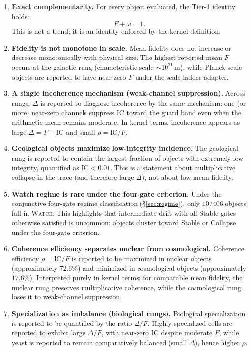 \documentclass[
  aps,
  prd,
  preprint,
  superscriptaddress,
  nofootinbib,
  floatfix
]{revtex4-2}
\newcommand{\IC}{\mathrm{IC}}
\begin{document}
\begin{enumerate}[leftmargin=2.2em]
  \item \textbf{Exact complementarity.}
  For every object evaluated, the Tier-1 identity holds:
  \begin{equation}
    F+\omega=1.
  \end{equation}
  This is not a trend; it is an identity enforced by the kernel definition.

  \item \textbf{Fidelity is not monotone in scale.}
  Mean fidelity does not increase or decrease monotonically with physical size.
  The highest reported mean $F$ occurs at the galactic rung (characteristic scale $\sim 10^{21}\,\mathrm{m}$),
  while Planck-scale objects are reported to have near-zero $F$ under the scale-ladder adapter.

  \item \textbf{A single incoherence mechanism (weak-channel suppression).}
  Across rungs, $\Delta$ is reported to diagnose incoherence by the same mechanism:
  one (or more) near-zero channels suppress $\IC$ toward the guard band even when the arithmetic mean remains moderate.
  In kernel terms, incoherence appears as large $\Delta=F-\IC$ and small $\rho=\IC/F$.

  \item \textbf{Geological objects maximize low-integrity incidence.}
  The geological rung is reported to contain the largest fraction of objects with extremely low integrity,
  quantified as $\IC<0.01$.
  This is a statement about multiplicative collapse in the trace (and therefore large $\Delta$), not about low mean fidelity.

  \item \textbf{Watch regime is rare under the four-gate criterion.}
  Under the conjunctive four-gate regime classification (\S\ref{sec:regime}), only $10/406$ objects fall in \textsc{Watch}.
  This highlights that intermediate drift with all Stable gates otherwise satisfied is uncommon;
  objects cluster toward Stable or Collapse under the four-gate criterion.

  \item \textbf{Coherence efficiency separates nuclear from cosmological.}
  Coherence efficiency $\rho=\IC/F$ is reported to be maximized in nuclear objects (approximately $72.6\%$)
  and minimized in cosmological objects (approximately $17.6\%$).
  Interpreted purely in kernel terms: for comparable mean fidelity, the nuclear rung preserves multiplicative coherence,
  while the cosmological rung loses it to weak-channel suppression.

  \item \textbf{Specialization as imbalance (biological rungs).}
  Biological specialization is reported to be quantified by the ratio $\Delta/F$.
  Highly specialized cells are reported to exhibit large $\Delta/F$, with near-zero $\IC$ despite moderate $F$,
  while yeast is reported to remain comparatively balanced (small $\Delta$), hence higher $\rho$.
\end{enumerate}
\end{document}
